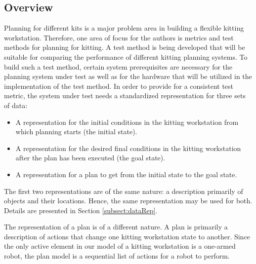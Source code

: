 \subsection{Overview}
Planning for different kits is a major problem area in building a
flexible kitting workstation. Therefore, one area of focus for the
authors is metrics and test methods for planning for
kitting.  A test method is being developed that will be suitable for
comparing the performance of different kitting planning systems.  To build
such a test method, certain system prerequisites are necessary for the planning
system under test as well as for the hardware that will be utilized in
the implementation of the test method.
In order to provide for a consistent test metric, the system under
test needs a standardized representation for three sets of data:
\begin{itemize}
\item A representation for the initial conditions in the kitting workstation
 from which planning starts (the initial state).

\item A representation for the desired final conditions in the kitting
workstation after the plan has been executed (the goal state).

\item A representation for a plan to get from the initial state to the goal
state.
\end{itemize}

The first two representations are of the same nature: a description
primarily of objects and their locations. Hence, the same representation
may be used for both. Details are presented in Section \ref{subsect:dataRep}.

The representation of a plan is of a different nature. A plan is primarily
a description of actions that change one kitting workstation state to
another. Since the only active element in our model of a kitting
workstation is a one-armed robot, the plan model is a sequential
list of actions for a robot to perform.

